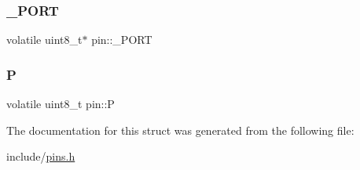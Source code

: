 \mbox{\label{structpin_a8533a7608dbc5287081146f6e013bc17}} 
\subsubsection{\texorpdfstring{\+\_\+\+P\+O\+RT}{\_PORT}}
{\footnotesize\ttfamily volatile uint8\+\_\+t$\ast$ pin\+::\+\_\+\+P\+O\+RT}

\mbox{\label{structpin_a367c20491645205002483e3d3c94760f}} 
\subsubsection{\texorpdfstring{P}{P}}
{\footnotesize\ttfamily volatile uint8\+\_\+t pin\+::P}



The documentation for this struct was generated from the following file\+:\begin{DoxyCompactItemize}
\item 
include/\mbox{\hyperlink{pins_8h}{pins.\+h}}\end{DoxyCompactItemize}
